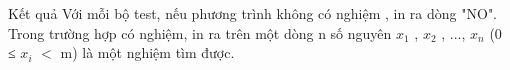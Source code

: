 Kết quả
Với mỗi bộ test, nếu phương trình không có nghiệm , in ra dòng "NO". Trong trường hợp có nghiệm, in ra trên một dòng n số nguyên $x_{1}$ , $x_{2}$ , ..., $x_{n}$ (0 ≤ $x_{i}$ $<$ m) là một nghiệm tìm được.